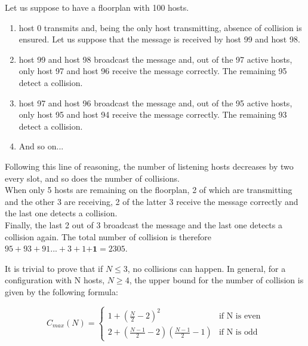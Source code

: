 \hfill \break
Let us suppose to have a floorplan with 100 hosts.\\
\begin{enumerate}
	\item
	host 0 transmits and, being the only host transmitting, absence of collision is ensured. Let us suppose that the message is received by host 99 and host 98.
	\item
	host 99 and host 98 broadcast the message and, out of the 97 active hosts, only host 97 and host 96 receive the message correctly. The remaining 95 detect a collision.
	\item
	host 97 and host 96 broadcast the message and, out of the 95 active hosts, only host 95 and host 94 receive the message correctly. The remaining 93 detect a collision.
	\item
	And so on...

\end{enumerate}
\hfill \break
Following this line of reasoning, the number of listening hosts decreases by two every slot, and so does the number of collisions.\\
When only 5 hosts are remaining on the floorplan, 2 of which are transmitting and the other 3 are receiving, 2 of the latter 3 receive the message correctly and the last one detects a collision.\\
Finally, the last 2 out of 3 broadcast the message and the last one detects a collision again.
\hfill \break
The total number of collision is therefore $95+93+91...+3+1\textbf{+1} = 2305$.

\hfill \break
It is trivial to prove that if $N \leq 3$, no collisions can happen.
\hfill \break
In general, for a configuration with N hosts, $N \geq 4$, the upper bound for the number of collision is given by the following formula:

\begin{equation}
\label{eq:collisionUpperBound}
	C_{max}(N) = \begin{cases}
	1+(\frac{N}{2}-2)^2 &\text{if N is even}\\
	2+(\frac{N-1}{2} - 2)(\frac{N-1}{2}-1) &\text{if N is odd}
	\end{cases}
\end{equation}
